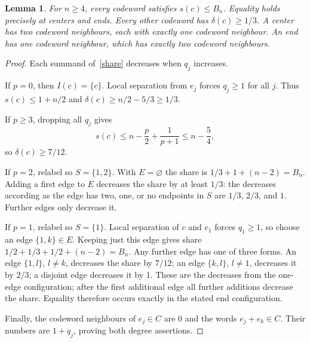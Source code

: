 \documentclass[11pt]{article}
\newtheorem{lemma}[theorem]{Lemma}
\begin{document}
\begin{lemma}\label{local}
For $n\ge4$, every codeword satisfies $s(c)\le B_n$. Equality holds precisely at centers and ends. Every other codeword has $\delta(c)\ge1/3$. A center has two codeword neighbours, each with exactly one codeword neighbour. An end has one codeword neighbour, which has exactly two codeword neighbours.
\end{lemma}
\begin{proof}
Each summand of~\eqref{share} decreases when $q_j$ increases.

If $p=0$, then $I(c)=\{c\}$. Local separation from $e_j$ forces $q_j\ge1$ for all $j$. Thus $s(c)\le1+n/2$ and $\delta(c)\ge n/2-5/3\ge1/3$.

If $p\ge3$, dropping all $q_j$ gives
\[
 s(c)\le n-\frac p2+\frac1{p+1}\le n-\frac54,
\]
so $\delta(c)\ge7/12$.

If $p=2$, relabel so $S=\{1,2\}$. With $E=\varnothing$ the share is $1/3+1+(n-2)=B_n$. Adding a first edge to $E$ decreases the share by at least $1/3$: the decreases according as the edge has two, one, or no endpoints in $S$ are $1/3$, $2/3$, and $1$. Further edges only decrease it.

If $p=1$, relabel so $S=\{1\}$. Local separation of $c$ and $e_1$ forces $q_1\ge1$, so choose an edge $\{1,k\}\in E$. Keeping just this edge gives share $1/2+1/3+1/2+(n-2)=B_n$. Any further edge has one of three forms. An edge $\{1,l\}$, $l\ne k$, decreases the share by $7/12$; an edge $\{k,l\}$, $l\ne1$, decreases it by $2/3$; a disjoint edge decreases it by $1$. These are the decreases from the one-edge configuration; after the first additional edge all further additions decrease the share. Equality therefore occurs exactly in the stated end configuration.

Finally, the codeword neighbours of $e_j\in C$ are $0$ and the words $e_j+e_k\in C$. Their numbers are $1+q_j$, proving both degree assertions.
\end{proof}
\end{document}
